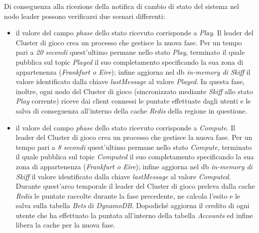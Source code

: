 \documentclass{sig-alternate-05-2015}
\begin{document}
Di conseguenza alla ricezione della notifica di cambio di stato del sistema nel nodo leader possono verificarsi due scenari differenti:
\begin{itemize}
\item il valore del campo \textit{phase} dello stato ricevuto corrisponde a \textit{Play}. Il leader del Cluster di gioco crea un processo che gestisce la nuova fase. Per un tempo pari a \textit{20 secondi} quest'ultimo permane nello stato \textit{Play}, terminato il quale pubblica sul topic \textit{Played} il suo completamento specificando la sua zona di appartenenza (\textit{Frankfurt o Eire}); infine aggiorna nel db \textit{in-memory di Skiff} il valore identificato dalla chiave \textit{lastMessage} al valore \textit{Played}.
In questa fase, inoltre, ogni nodo del Cluster di gioco (sincronizzato mediante \textit{Skiff} allo stato \textit{Play} corrente) riceve dai client connessi le puntate effettuate dagli utenti e le salva di conseguenza all'interno della cache \textit{Redis} della regione in questione.  
\item il valore del campo \textit{phase} dello stato ricevuto corrisponde a \textit{Compute}. Il leader del Cluster di gioco crea un processo che gestisce la nuova fase. Per un tempo pari a \textit{8 secondi} quest'ultimo permane nello stato \textit{Compute}, terminato il quale pubblica sul topic \textit{Computed} il suo completamento specificando la sua zona di appartenenza (\textit{Frankfurt o Eire}); infine aggiorna nel db \textit{in-memory di Skiff} il valore identificato dalla chiave \textit{lastMessage} al valore \textit{Computed}.
Durante quest'arco temporale il leader del Cluster di gioco preleva dalla cache \textit{Redis} le puntate raccolte durante la fase precedente, ne calcola l'esito e le salva sulla tabella \textit{Bets} di \textit{DynamoDB}. Dopodich\'e aggiorna il credito di ogni utente che ha effettuato la puntata all'interno della tabella \textit{Accounts} ed infine libera la cache per la nuova fase.
\end{itemize}
\end{document}
